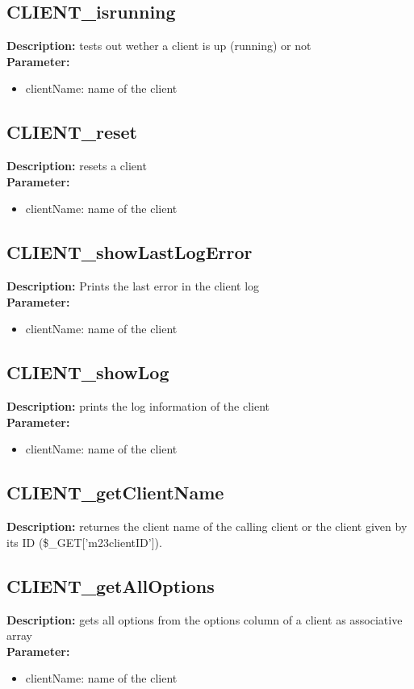 \subsection{CLIENT\_isrunning}
\textbf{Description:} tests out wether a client is up (running) or not\\
\textbf{Parameter:}
\begin{itemize}
\item clientName: name of the client
\end{itemize}

\subsection{CLIENT\_reset}
\textbf{Description:} resets a client\\
\textbf{Parameter:}
\begin{itemize}
\item clientName: name of the client
\end{itemize}

\subsection{CLIENT\_showLastLogError}
\textbf{Description:} Prints the last error in the client log\\
\textbf{Parameter:}
\begin{itemize}
\item clientName: name of the client
\end{itemize}

\subsection{CLIENT\_showLog}
\textbf{Description:} prints the log information of the client\\
\textbf{Parameter:}
\begin{itemize}
\item clientName: name of the client
\end{itemize}

\subsection{CLIENT\_getClientName}
\textbf{Description:} returnes the client name of the calling client or the client given by its ID (\$\_GET['m23clientID']).\\

\subsection{CLIENT\_getAllOptions}
\textbf{Description:} gets all options from the options column of a client as associative array\\
\textbf{Parameter:}
\begin{itemize}
\item clientName: name of the client
\end{itemize}


